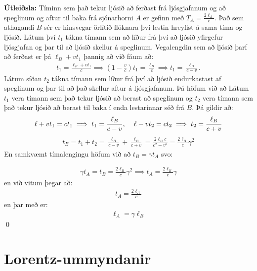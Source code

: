 \ifdefined \wholebook \else\documentclass[oneside]{book}\usepackage{EdlBook}\graphicspath{{figures/}}
\begin{document}
\textbf{Útleiðsla:} Tíminn sem það tekur ljósið að ferðast frá ljósgjafanum og að speglinum og aftur til baka frá sjónarhorni $A$ er gefinn með $T_A = \frac{2\ell_A}{c}$. Það sem athugandi $B$ sér er hinsvegar örlítið flóknara því lestin hreyfist á sama tíma og ljósið. Látum því $t_1$ tákna tímann sem að líður frá því að ljósið yfirgefur ljósgjafan og þar til að ljósið skellur á speglinum. Vegalengdin sem að ljósið þarf að ferðast er þá $\ell_B  + vt_1$ þannig að við fáum að:
\begin{align*}
    t_1 = \frac{\ell_B + vt_1}{c} \implies \left(1 - \frac{v}{c} \right)t_1 = \frac{\ell_B}{c} \implies t_1 = \frac{\ell_B}{c-v}.
\end{align*}
Látum síðan $t_2$ tákna tímann sem líður frá því að ljósið endurkastast af speglinum og þar til að það skellur aftur á ljósgjafanum. Þá höfum við að
Látum $t_1$ vera tímann sem það tekur ljósið að berast að speglinum og $t_2$ vera tímann sem það tekur ljósið að berast til baka í enda lestarinnar séð frá $B$. Þá gildir að:
\begin{align*}
     \ell + vt_1 = ct_1 \implies t_1 = \frac{\ell_B}{c-v}, \hspace{0.4cm} \ell - vt_2 = ct_2 \implies t_2 = \frac{\ell_B}{c+v}
\end{align*}
\begin{align*}
    t_B = t_1 + t_2 =  \frac{\ell_B}{c-v} + \frac{\ell_B}{c+v} = \frac{2\ell_B c}{c^2 - v^2} = \frac{2\ell_B}{c} \gamma^2
\end{align*}
En samkvæmt tímalengingu höfum við að $t_B = \gamma t_A$ svo:

\begin{align*}
 \gamma t_A = t_B =  \frac{2\ell_B}{c}\gamma^2 \implies t_A = \frac{2\ell_B}{c}\gamma
\end{align*}
en við vitum þegar að:
\begin{align*}
    t_A = \frac{2\ell_A}{c}
\end{align*}
en þar með er:
\begin{align*}
    \ell_A = \gamma \ell_B
\end{align*}
\qed

\section{Lorentz-ummyndanir}

\begin{tcolorbox}

 \\

\vspace{-0.5cm}
\end{tcolorbox}
\end{document}
